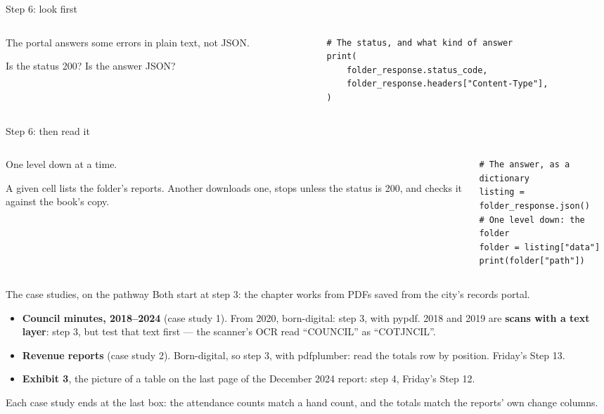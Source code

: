 \documentclass[9pt,aspectratio=169]{beamer}
\begin{document}
\begin{frame}[fragile]{Step 6: look first}
    \begin{columns}[T]
        \begin{column}{0.37\textwidth}
            The portal answers some errors in plain text, not JSON.

            \medskip
            Is the status 200? Is the answer JSON?
        \end{column}
        \begin{column}{0.6\textwidth}
\begin{lstlisting}
# The status, and what kind of answer
print(
    folder_response.status_code,
    folder_response.headers["Content-Type"],
)
\end{lstlisting}
        \end{column}
    \end{columns}
\end{frame}

\begin{frame}[fragile]{Step 6: then read it}
    \begin{columns}[T]
        \begin{column}{0.37\textwidth}
            One level down at a time.

            \medskip
            A given cell lists the folder's reports. Another downloads one, stops unless the status is 200, and checks it against the book's copy.
        \end{column}
        \begin{column}{0.6\textwidth}
\begin{lstlisting}
# The answer, as a dictionary
listing = folder_response.json()
# One level down: the folder
folder = listing["data"]
print(folder["path"])
\end{lstlisting}
        \end{column}
    \end{columns}
\end{frame}

\begin{frame}{The case studies, on the pathway}
    Both start at step 3: the chapter works from PDFs saved from the city's records portal.
    \begin{itemize}
        \item \textbf{Council minutes, 2018--2024} (case study 1). From 2020, born-digital: step 3, with pypdf. 2018 and 2019 are \textbf{scans with a text layer}: step 3, but test that text first --- the scanner's OCR read ``COUNCIL'' as ``COTJNCIL''.
        \item \textbf{Revenue reports} (case study 2). Born-digital, so step 3, with pdfplumber: read the totals row by position. Friday's Step 13.
        \item \textbf{Exhibit 3}, the picture of a table on the last page of the December 2024 report: step 4, Friday's Step 12.
    \end{itemize}
    \medskip
    Each case study ends at the last box: the attendance counts match a hand count, and the totals match the reports' own change columns.
\end{frame}
\end{document}
